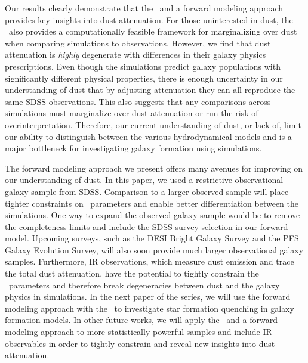 Our results clearly demonstrate that the \eda~and a forward modeling approach
provides key insights into dust attenuation. For those uninterested in dust,
the \eda~also provides a computationally feasible framework for marginalizing
over dust when comparing simulations to observations. 
However, we find that dust attenuation is {\em highly} degenerate with
differences in their galaxy physics prescriptions.
Even though the simulations predict galaxy populations with significantly
different physical properties, there is enough uncertainty in our
understanding of dust that by adjusting attenuation they can all
reproduce the same SDSS observations.
This also suggests that any comparisons across simulations must marginalize
over dust attenuation or run the risk of overinterpretation. 
Therefore, our current understanding of dust, or lack of, limit our ability to
distinguish between the various hydrodynamical models and is a major bottleneck
for investigating galaxy formation using simulations.

The forward modeling approach we present offers many avenues for improving on
our understanding of dust. In this paper, we used a restrictive observational
galaxy sample from SDSS. Comparison to a larger observed sample will place
tighter constraints on \eda~parameters and enable better
differentiation between the simulations. One way to expand the observed galaxy
sample would be to remove the completeness limits and include the SDSS survey
selection in our forward model. Upcoming surveys, such as the DESI
Bright Galaxy Survey and the PFS Galaxy Evolution Survey, will also soon
provide much larger observational galaxy samples. Furthermore, IR observations,
which measure dust emission and trace the total dust attenuation, have the
potential to tightly constrain the \eda~parameters and therefore break degeneracies
between dust and the galaxy physics in simulations. 
In the next paper of the series, we will use the forward modeling approach
with the \eda~to investigate star formation quenching in galaxy formation
models. 
In other future works, we will apply the \eda~and a forward modeling approach
to more statistically powerful samples and include IR observables in order to
tightly constrain and reveal new insights into dust attenuation. 
